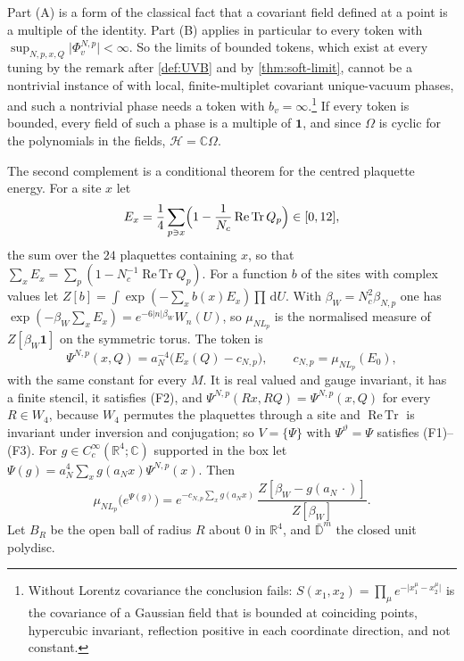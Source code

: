 \documentclass[11pt,a4paper]{amsart}
\theoremstyle{definition}
\theoremstyle{remark}
\numberwithin{equation}{section}
\DeclareMathOperator{\ReTr}{Re\,Tr}  %
\newcommand{\R}{\mathbb{R}}          %
\newcommand{\C}{\mathbb{C}}          %
\newcommand{\Hilb}{\mathcal{H}}      %
\newcommand{\abs}[1]{\lvert #1\rvert}      %
\newcommand{\dd}{\,\mathrm{d}}             %
\newcommand{\hypW}{\text{\upshape(W)}}              %
\newcommand{\aN}{a_N}                      %
\newcommand{\Lp}{L_p}                      %
\newcommand{\betaNp}{\beta_{N,p}}          %
\newcommand{\betaW}{\beta_{W}}             %
\begin{document}
Part (A) is a form of the classical fact that a covariant field defined at a point is a multiple of the identity. Part (B) applies in particular to every token with $\sup_{N,p,x,Q}\abs{\Phi^{N,p}_v}<\infty$. So the limits of bounded tokens, which exist at every tuning by the remark after \cref{def:UVB} and by \cref{thm:soft-limit}, cannot be a nontrivial instance of \hypW{} with local, finite-multiplet covariant unique-vacuum phases, and such a nontrivial phase needs a token with $b_v=\infty$.\footnote{Without Lorentz covariance the conclusion fails: $S(x_1,x_2)=\prod_{\mu}e^{-\abs{x_1^\mu-x_2^\mu}}$ is the covariance of a Gaussian field that is bounded at coinciding points, hypercubic invariant, reflection positive in each coordinate direction, and not constant.} If every token is bounded, every field of such a phase is a multiple of $\mathbf 1$, and since $\Omega$ is cyclic for the polynomials in the fields, $\Hilb=\C\Omega$.

The second complement is a conditional theorem for the centred plaquette energy. For a site $x$ let
\[
E_x=\frac14\sum_{p\ni x}\Bigl(1-\frac{1}{N_c}\ReTr Q_p\Bigr)\in[0,12],
\]
the sum over the $24$ plaquettes containing $x$, so that $\sum_xE_x=\sum_p(1-N_c^{-1}\ReTr Q_p)$. For a function $b$ of the sites with complex values let $Z[b]=\int\exp(-\sum_xb(x)E_x)\prod\dd U$. With $\betaW=N_c^2\betaNp$ one has $\exp(-\betaW\sum_xE_x)=e^{-6\abs{n}\betaW}W_n(U)$, so $\mu_{N\Lp}$ is the normalised measure of $Z[\betaW\mathbf 1]$ on the symmetric torus. The token is
\begin{equation}\label{eq:energy-token}
\Psi^{N,p}(x,Q)=\aN^{-4}\bigl(E_x(Q)-c_{N,p}\bigr),\qquad c_{N,p}=\mu_{N\Lp}(E_0),
\end{equation}
with the same constant for every $M$. It is real valued and gauge invariant, it has a finite stencil, it satisfies (F2), and $\Psi^{N,p}(Rx,RQ)=\Psi^{N,p}(x,Q)$ for every $R\in W_4$, because $W_4$ permutes the plaquettes through a site and $\ReTr$ is invariant under inversion and conjugation; so $V=\{\Psi\}$ with $\Psi^\vartheta=\Psi$ satisfies (F1)--(F3). For $g\in C^\infty_c(\R^4;\C)$ supported in the box let $\Psi(g)=\aN^4\sum_xg(\aN x)\Psi^{N,p}(x)$. Then
\begin{equation}\label{eq:energy-generating}
\mu_{N\Lp}\bigl(e^{\Psi(g)}\bigr)=e^{-c_{N,p}\sum_xg(\aN x)}\,\frac{Z[\betaW-g(\aN\,\cdot)]}{Z[\betaW]} .
\end{equation}
Let $B_R$ be the open ball of radius $R$ about $0$ in $\R^4$, and $\bar{\mathbb D}^m$ the closed unit polydisc.
\end{document}
